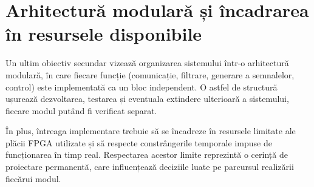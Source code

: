 \section{Arhitectură modulară și încadrarea în resursele disponibile}
\label{sec:obj-modular}

Un ultim obiectiv secundar vizează organizarea sistemului într-o arhitectură
modulară, în care fiecare funcție (comunicație, filtrare, generare a semnalelor,
control) este implementată ca un bloc independent. O astfel de structură ușurează
dezvoltarea, testarea și eventuala extindere ulterioară a sistemului, fiecare
modul putând fi verificat separat.

În plus, întreaga implementare trebuie să se încadreze în resursele limitate ale
plăcii FPGA utilizate și să respecte constrângerile temporale impuse de
funcționarea în timp real. Respectarea acestor limite reprezintă o cerință de
proiectare permanentă, care influențează deciziile luate pe parcursul realizării
fiecărui modul.
